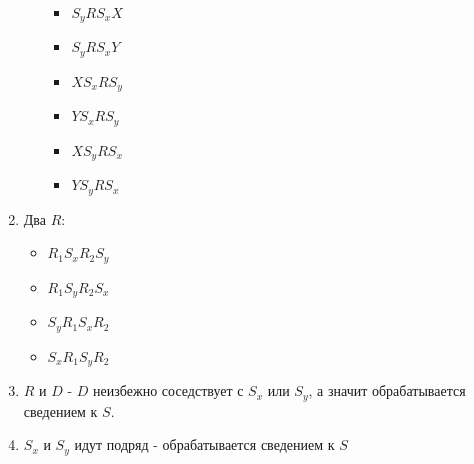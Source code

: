 \begin{enumerate}
\begin{enumerate}
\begin{itemize}
			\item $S_y R S_x X$
			\item $S_y R S_x Y$
			\item $X S_x R S_y$
			\item $Y S_x R S_y$
			\item $X S_y R S_x$
			\item $Y S_y R S_x$
		\end{itemize}
	\end{enumerate}
	\item Два $R$:
	\begin{itemize}
			\item $R_1 S_x R_2 S_y$
			\item $R_1 S_y R_2 S_x$
			\item $S_y R_1 S_x R_2$
			\item $S_x R_1 S_y R_2$
	\end{itemize}
	\item $R$ и $D$ - $D$ неизбежно соседствует с $S_x$ или $S_y$, а значит обрабатывается сведением к $S$.
	\item $S_x$ и $S_y$ идут подряд - обрабатывается сведением к $S$
\end{enumerate}